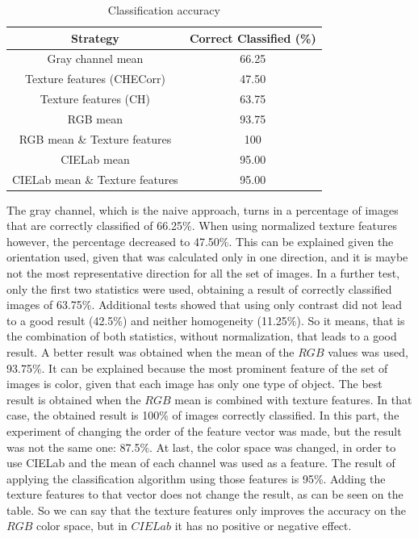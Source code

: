 \documentclass{IEEEtran}
\begin{document}
\begin{table}[h!] 
\centering
\begin{tabular}{|c|c|}
\hline
\textbf{Strategy} & \textbf{Correct Classified (\%)} \\
\hline
Gray channel mean & 66.25  \\
\hline
Texture features (CHECorr) & 47.50  \\ %
\hline
Texture features (CH) & 63.75  \\ %
\hline
RGB mean & 93.75 \\
\hline
RGB mean \& Texture features & 100 \\ %
\hline
CIELab mean & 95.00  \\
\hline
CIELab mean \& Texture features & 95.00  \\
\hline
\end{tabular}
\caption{Classification accuracy}
\label{tb:accuracy_class}
\end{table}

The gray channel, which is the naive approach, turns in a percentage of images that are correctly classified of 66.25\%. When using normalized texture features however, the percentage decreased to 47.50\%. This can be explained given the orientation used, given that was calculated only in one direction, and it is maybe not the most representative direction for all the set of images. In a further test, only the first two statistics were used, obtaining a result of correctly classified images of 63.75\%. Additional tests showed that using only contrast did not lead to a good result (42.5\%) and neither homogeneity (11.25\%). So it means, that is the combination of both statistics, without normalization, that leads to a good result. A better result was obtained when the mean of the $RGB$ values was used, 93.75\%. It can be explained because the most prominent feature of the set of images is color, given that each image has only one type of object. The best result is obtained when the $RGB$ mean is combined with texture features. In that case, the obtained result is 100\% of images correctly classified. In this part, the experiment of changing the order of the feature vector was made, but the result was not the same one: 87.5\%. At last, the color space was changed, in order to use CIELab and the mean of each channel was used as a feature. The result of applying the classification algorithm using those features is 95\%. Adding the texture features to that vector does not change the result, as can be seen on the table. So we can say that the texture features only improves the accuracy on the $RGB$ color space, but in $CIELab$ it has no positive or negative effect.\\
\end{document}
